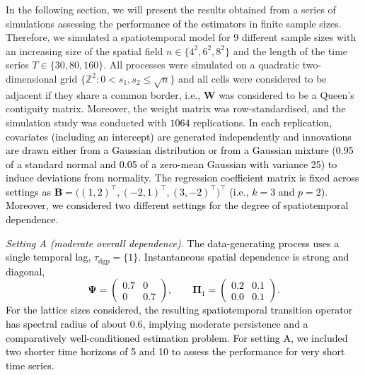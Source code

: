\documentclass[12pt]{article}
\theoremstyle{plain}
\theoremstyle{definition}
\newcommand{\xmat}{\mathbf}
\newcommand{\xset}{\mathds}
\begin{document}
In the following section, we will present the results obtained from a series of simulations assessing the \textcolor{black}{performance of the estimators} in finite sample sizes. Therefore, we simulated a spatiotemporal model for 9 different sample sizes with an increasing size of the spatial field $n \in \{4^2, 6^2, 8^2\}$ and the length of the time series $T \in \{30, 80, 160\}$. All processes were simulated on a quadratic two-dimensional grid $\{\xset{Z}^2: 0 < s_1, s_2 \leq \sqrt{n}\}$ and all cells were considered to be adjacent if they share a common border, i.e., $\xmat{W}$ was considered to be a Queen's contiguity matrix. Moreover, the weight matrix was row-standardised, and the simulation study was conducted with \textcolor{black}{$1064$} replications. %
\textcolor{black}{In each replication, covariates (including an intercept) are generated independently and innovations are drawn either from a Gaussian distribution or from a Gaussian mixture (0.95 of a standard normal and 0.05 of a zero-mean Gaussian with variance 25) to induce deviations from normality. The regression coefficient matrix is fixed across settings as $\mathbf B=\bigl((1,2)^\top,(-2,1)^\top,(3,-2)^\top\bigr)^\top$ (i.e., $k=3$ and $p=2$). Moreover, we considered two different settings for the degree of spatiotemporal dependence.}

\textcolor{black}{
\emph{Setting A (moderate overall dependence).} The data-generating process uses a single temporal lag, $\tau_{\text{dgp}}=\{1\}$. Instantaneous spatial dependence is strong and diagonal,
\[
\mathbf\Psi=
\begin{pmatrix}
0.7 & 0\\
0 & 0.7
\end{pmatrix},
\qquad
\mathbf\Pi_{1}=
\begin{pmatrix}
0.2 & 0.1\\
0.0 & 0.1
\end{pmatrix}.
\]
For the lattice sizes considered, the resulting spatiotemporal transition operator has spectral radius of about $0.6$, implying moderate persistence and a comparatively well-conditioned estimation problem. For setting A, we included two shorter time horizons of 5 and 10 to assess the performance for very short time series.}
\end{document}
